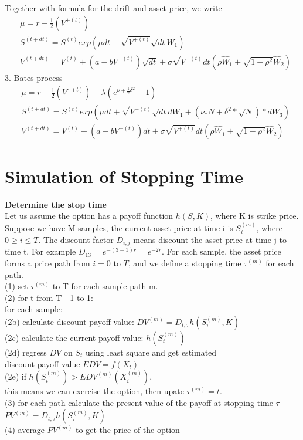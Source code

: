 \documentclass[a4paper]{article}
\begin{document}
Together with formula for the drift and asset price, we write
\begin{align*}
	& \mu = r - \frac{1}{2} (V^{+(t)})\\
	& S^{(t + dt)} = S^{(t)}exp(\mu dt + \sqrt{V^{+(t)}} \sqrt{dt} W_1) \\
	& V^{(t + dt)} = V^{(t)} + (a - b V^{+(t)}) \sqrt{dt} + \sigma \sqrt{V^{+(t)}} dt (\rho \hat W_1
	+ \sqrt{1 - \rho^2} \hat W_2) 
\end{align*}        
3. Bates process\\
\begin{align*}
	& \mu = r - \frac{1}{2} (V^{+(t)}) - \lambda (e^{\nu + \frac{1}{2}\delta^2}  -1) \\
	& S^{(t + dt)} = S^{(t)}exp(\mu dt  + \sqrt{V^{+(t)}} \sqrt{dt} dW_1 
	   + (\nu_*N+\delta^2*\sqrt{N})*dW_3)\\
	& V^{(t + dt)} = V^{(t)} + (a - b V^{+(t)}) dt + \sigma \sqrt{V^{+(t)}} dt (\rho \hat W_1
	+ \sqrt{1 - \rho^2} \hat W_2 )
\end{align*}
\section{Simulation of Stopping Time }
{\bf Determine the stop time}\\
Let us assume the option has a payoff function $h(S, K)$, where K is strike price.
Suppose we have M samples, the current asset price at time i is $S^{(m)}_i$, where $0 \geq i \leq T$. The discount factor $D_{i,j}$ means discount the asset price at time j to time t. For example $D_{13} = e^{-(3-1)r} = e^{-2r}$. 
For each sample, the asset price forms a price path from $i = 0$ to $T$, and we define a stopping time $\tau^{(m)}$ for each path. \\
(1) set $\tau^{(m)}$ to T for each sample path m.\\
(2) for t from T - 1 to 1:\\
\indent  for each sample:\\
\indent  (2b) calculate discount payoff value: $DV^{(m)} = D_{t, \tau} h(S^{(m)}_\tau, K) $\\
\indent  (2c) calculate the current payoff value: $h(S^{(m)}_t)$\\
\indent	 (2d) regress $DV$ on ${S_t}$ using least square and get estimated \\
\indent      discount payoff value $EDV = f(X_t)$\\
\indent	 (2e) if $h(S^{(m)}_t) > EDV^{(m)}(X^{(m)}_i)$, \\
\indent       this means we can exercise the option, then upate $\tau^{(m)} = t$.\\
(3) for each path calculate the present value of the payoff at stopping time $\tau$ \\
$PV^{(m)} = D_{t, \tau} h(S^{(m)}_\tau, K)$\\
(4) average $PV^{(m)}$ to get the price of the option\\
\end{document}
